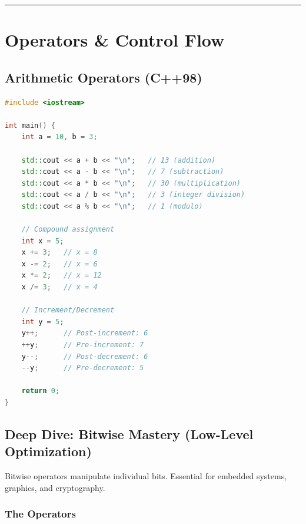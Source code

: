 \begin{center}\rule{0.5\linewidth}{0.5pt}\end{center}

\hypertarget{operators-control-flow}{%
\section{Operators \& Control Flow}\label{operators-control-flow}}

\hypertarget{arithmetic-operators-c98}{%
\subsection{Arithmetic Operators
(C++98)}\label{arithmetic-operators-c98}}

\begin{lstlisting}[language={C++}]
#include <iostream>

int main() {
    int a = 10, b = 3;
    
    std::cout << a + b << "\n";   // 13 (addition)
    std::cout << a - b << "\n";   // 7 (subtraction)
    std::cout << a * b << "\n";   // 30 (multiplication)
    std::cout << a / b << "\n";   // 3 (integer division)
    std::cout << a % b << "\n";   // 1 (modulo)
    
    // Compound assignment
    int x = 5;
    x += 3;   // x = 8
    x -= 2;   // x = 6
    x *= 2;   // x = 12
    x /= 3;   // x = 4
    
    // Increment/Decrement
    int y = 5;
    y++;      // Post-increment: 6
    ++y;      // Pre-increment: 7
    y--;      // Post-decrement: 6
    --y;      // Pre-decrement: 5
    
    return 0;
}
\end{lstlisting}

\hypertarget{deep-dive-bitwise-mastery-low-level-optimization}{%
\subsection{Deep Dive: Bitwise Mastery (Low-Level
Optimization)}\label{deep-dive-bitwise-mastery-low-level-optimization}}

Bitwise operators manipulate individual bits. Essential for embedded
systems, graphics, and cryptography.

\hypertarget{the-operators}{%
\subsubsection{The Operators}\label{the-operators}}

